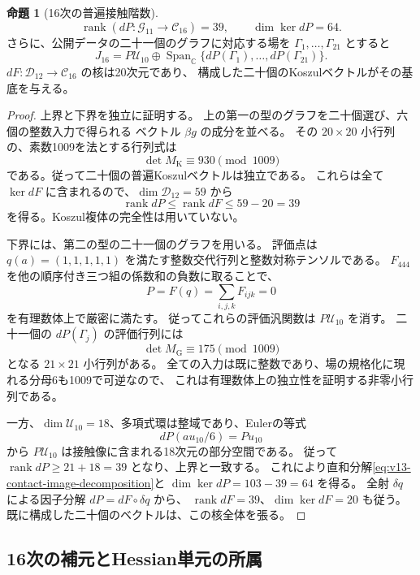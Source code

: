 \documentclass[a4paper,11pt]{ltjsarticle}
\theoremstyle{definition}
\newtheorem{proposition}[theorem]{命題}
\newcommand{\CC}{\mathbb C}
\begin{document}
\begin{proposition}[16次の普遍接触階数]
\label{prop:v13-contact-rank-sixteenth}
\[
 \operatorname{rank}(dP:\mathcal G_{11}\to\mathcal C_{16})=39,
 \qquad \dim\ker dP=64.
\]
さらに、公開データの二十一個のグラフに対応する場を
$\Gamma_1,\ldots,\Gamma_{21}$ とすると
\begin{equation}\label{eq:v13-contact-image-decomposition}
 J_{16}=P\mathcal U_{10}
       \oplus\operatorname{Span}_{\CC}\{dP(\Gamma_1),\ldots,dP(\Gamma_{21})\}.
\end{equation}
$dF:\mathcal D_{12}\to\mathcal C_{16}$ の核は20次元であり、
構成した二十個のKoszulベクトルがその基底を与える。
\end{proposition}
\begin{proof}
上界と下界を独立に証明する。
上の第一の型のグラフを二十個選び、六個の整数入力で得られる
ベクトル $\beta g$ の成分を並べる。
その $20\times20$ 小行列の、素数1009を法とする行列式は
\[
 \det M_{\mathrm K}\equiv930\pmod{1009}
\]
である。従って二十個の普遍Koszulベクトルは独立である。
これらは全て $\ker dF$ に含まれるので、$\dim\mathcal D_{12}=59$ から
\[
 \operatorname{rank}dP\le\operatorname{rank}dF\le59-20=39
\]
を得る。Koszul複体の完全性は用いていない。

下界には、第二の型の二十一個のグラフを用いる。
評価点は $q(a)=(1,1,1,1,1)$ を満たす整数交代行列と整数対称テンソルである。
$F_{444}$ を他の順序付き三つ組の係数和の負数に取ることで、
\[
 P=F(q)=\sum_{i,j,k}F_{ijk}=0
\]
を有理数体上で厳密に満たす。
従ってこれらの評価汎関数は $P\mathcal U_{10}$ を消す。
二十一個の $dP(\Gamma_j)$ の評価行列には
\[
 \det M_{\mathrm G}\equiv175\pmod{1009}
\]
となる $21\times21$ 小行列がある。
全ての入力は既に整数であり、場の規格化に現れる分母6も1009で可逆なので、
これは有理数体上の独立性を証明する非零小行列である。

一方、$\dim\mathcal U_{10}=18$、多項式環は整域であり、Eulerの等式
\[
 dP(au_{10}/6)=Pu_{10}
\]
から $P\mathcal U_{10}$ は接触像に含まれる18次元の部分空間である。
従って $\operatorname{rank}dP\ge21+18=39$ となり、上界と一致する。
これにより直和分解\eqref{eq:v13-contact-image-decomposition}と
$\dim\ker dP=103-39=64$ を得る。
全射 $\delta q$ による因子分解 $dP=dF\circ\delta q$ から、
$\operatorname{rank}dF=39$、$\dim\ker dF=20$ も従う。
既に構成した二十個のベクトルは、この核全体を張る。
\end{proof}

\subsection{16次の補元とHessian単元の所属}
\label{subsec:v13-sixteenth-complement}
\end{document}
